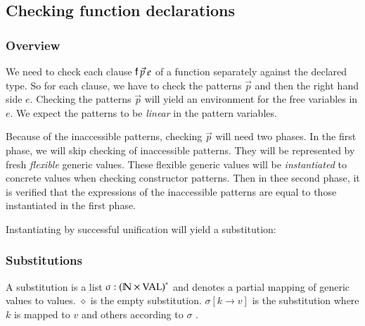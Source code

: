 \subsection{Checking function declarations}

\newcommand\checkcl[2]{#1\:\mathbf{checkcl}\:#2}
\newcommand\checkp[5]{(#1)\vdash#2\:\mathbf{Pat}\:#3\Rightarrow (#4),#5}
\newcommand\checkps[5]{(#1)\vdash#2\:\mathbf{Pats}\:#3\Rightarrow (#4),#5}
\newcommand\checkinacc[4]{(#1)\vdash#2\:\mathbf{checkinacc}\:#3 : #4}
\newcommand\unify[5]{#1,#2\vdash#3\:\mathbf{inst}\:#4\Rightarrow #5}
\newcommand\unifylist[5]{#1,#2\vdash#3\:\mathbf{inst_{list}}\:#4\Rightarrow #5}


\subsubsection{Overview}
We need to check each clause $\mathsf{f} \: \vec{p} \: e$ of a function separately against the declared type.
So for each clause, we have to check the patterns $\vec{p}$ and then the right hand side $e$.
Checking the patterns $\vec{p}$ will yield an environment for the free variables in $e$.
We expect the patterns to be \emph{linear} in the pattern variables.

Because of the inaccessible patterns, checking $\vec{p}$ will need two phases.
In the first phase, we will skip checking of inaccessible patterns.
They will be represented by fresh \emph{flexible} generic values.
These flexible generic values will be \emph{instantiated} to concrete values when checking constructor patterns.
Then in thee second phase, it is verified that the expressions of the inaccessible patterns are equal to those instantiated in the first phase.
\newcommand{\subst}[2]{#1\{#2\}}
\newcommand{\substEnv}[2]{#1\{#2\}}
\newcommand{\compS}[2]{\opn{comp}\:#1\:#2}
\newcommand\ptv[2]{#1\Searrow#2}
\newcommand\ptvx{\opn{p2v}}
\newcommand\pstvs{\opn{p_{s}2v_{s}}}

Instantiating by successful unification will yield a substitution:
\subsubsection{Substitutions}
A substitution is a list $\sigma : {(\mathbb{N} \times \operatorname{VAL})}^{\ast} $ and denotes a partial mapping of generic values to values.
$\diamond$ is the empty substitution.
$\sigma[k \rightarrow v] $ is the substitution where $k$ is mapped to $v$ and others according to $\sigma$ .

